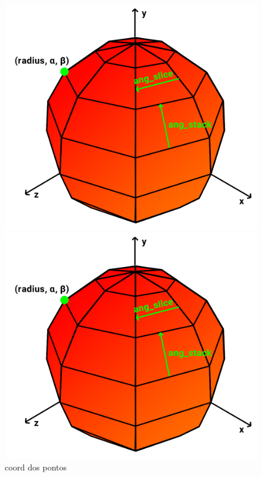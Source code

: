 \documentclass[a4paper]{report}
\begin{document}
\begin{figure}[H]
    \centering
    \begin{minipage}{0.33\textwidth}
        \centering
        \includegraphics[width=\textwidth]{images/sphere_vetores.png}
        \caption{coord dos pontos}
    \end{minipage}\hfill
    \begin{minipage}{0.33\textwidth}
        \centering
        \includegraphics[width=\textwidth]{images/sphere_vetores.png}

\end{minipage}
\end{figure}
\end{document}
